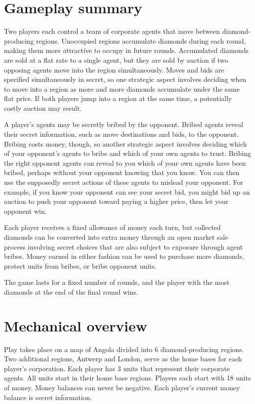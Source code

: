 \documentclass[12pt]{article}
\begin{document}
\section{Gameplay summary}

Two players each control a team of corporate agents that move between diamond-producing regions.  Unoccupied regions accumulate diamonds during each round, making them more attractive to occupy in future rounds.  Accumulated diamonds are sold at a flat rate to a single agent, but they are sold by auction if two opposing agents move into the region simultaneously.  Moves and bids are specified simultaneously in secret, so one strategic aspect involves deciding when to move into a region as more and more diamonds accumulate under the same flat price.  If both players jump into a region at the same time, a potentially costly auction may result.

A player's agents may be secretly bribed by the opponent.  Bribed agents reveal their secret information, such as move destinations and bids, to the opponent.  Bribing costs money, though, so another strategic aspect involves deciding which of your opponent's agents to bribe and which of your own agents to trust.  Bribing the right opponent agents can reveal to you which of your own agents have been bribed, perhaps without your opponent knowing that you know.  You can then use the supposedly secret actions of these agents to mislead your opponent.  For example, if you know your opponent can see your secret bid, you might bid up an auction to push your opponent toward paying a higher price, then let your opponent win.

Each player receives a fixed allowance of money each turn, but collected diamonds can be converted into extra money through an open market sale process involving secret choices that are also subject to exposure through agent bribes.  Money earned in either fashion can be used to purchase more diamonds, protect units from bribes, or bribe opponent units.  

The game lasts for a fixed number of rounds, and the player with the most diamonds at the end of the final round wins.


\section{Mechanical overview}

Play takes place on a map of Angola divided into 6 diamond-producing regions.  Two additional regions, Antwerp and London, serve as the home bases for each player's corporation.  Each player has 3 units that represent their corporate agents.  All units start in their home base regions.  Players each start with 18 units of money.  Money balances can never be negative.  Each player's current money balance is secret information.
\end{document}
